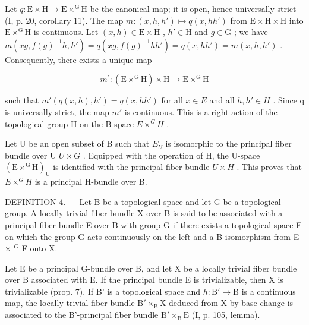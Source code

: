 Let \(q \colon \mathrm{E} \times \mathrm{H} \to \mathrm{E} \times^{\mathrm{G}} \mathrm{H}\) be the canonical map; it is open, hence universally strict (I, p. 20, corollary 11). The map \(m \colon (x, h, h') \mapsto q(x, hh')\) from \(\mathrm{E} \times \mathrm{H} \times \mathrm{H}\) into \(\mathrm{E} \times^{\mathrm{G}} \mathrm{H}\) is continuous. Let \((x, h) \in \mathrm{E} \times \mathrm{H}\) , \(h' \in \mathrm{H}\) and \(g \in \mathrm{G}\) ; we have \(m(xg, f(g)^{-1}h, h') = q(xg, f(g)^{-1}hh') = q(x, hh') = m(x, h, h')\) . Consequently, there exists a unique map

\[
m ^ {\prime} \colon (\mathrm{E} \times^ {\mathrm{G}} \mathrm{H}) \times \mathrm{H} \rightarrow \mathrm{E} \times^ {\mathrm{G}} \mathrm{H}
\]

such that \(m'(q(x,h),h') = q(x,hh')\) for all \(x \in E\) and all \(h, h' \in H\) . Since q is universally strict, the map \(m'\) is continuous. This is a right action of the topological group H on the B-space \(E \times^{G} H\) .

Let U be an open subset of B such that \(E_{U}\) is isomorphic to the principal fiber bundle over U \(U \times G\) . Equipped with the operation of H, the U-space \((\mathrm{E} \times^{\mathrm{G}}\mathrm{H})_{\mathrm{U}}\) is identified with the principal fiber bundle \(U \times H\) . This proves that \(E \times^{G}H\) is a principal H-bundle over B.

DEFINITION 4. --- Let B be a topological space and let G be a topological group. A locally trivial fiber bundle X over B is said to be associated with a principal fiber bundle E over B with group G if there exists a topological space F on which the group G acts continuously on the left and a B-isomorphism from E × \(^{G}\) F onto X.

Let E be a principal G-bundle over B, and let X be a locally trivial fiber bundle over B associated with E. If the principal bundle E is trivializable, then X is trivializable (prop. 7). If B' is a topological space and \(h \colon \mathrm{B}' \to \mathrm{B}\) is a continuous map, the locally trivial fiber bundle \(\mathrm{B}' \times_{\mathrm{B}} \mathrm{X}\) deduced from X by base change is associated to the B'-principal fiber bundle \(\mathrm{B}' \times_{\mathrm{B}} \mathrm{E}\) (I, p. 105, lemma).


